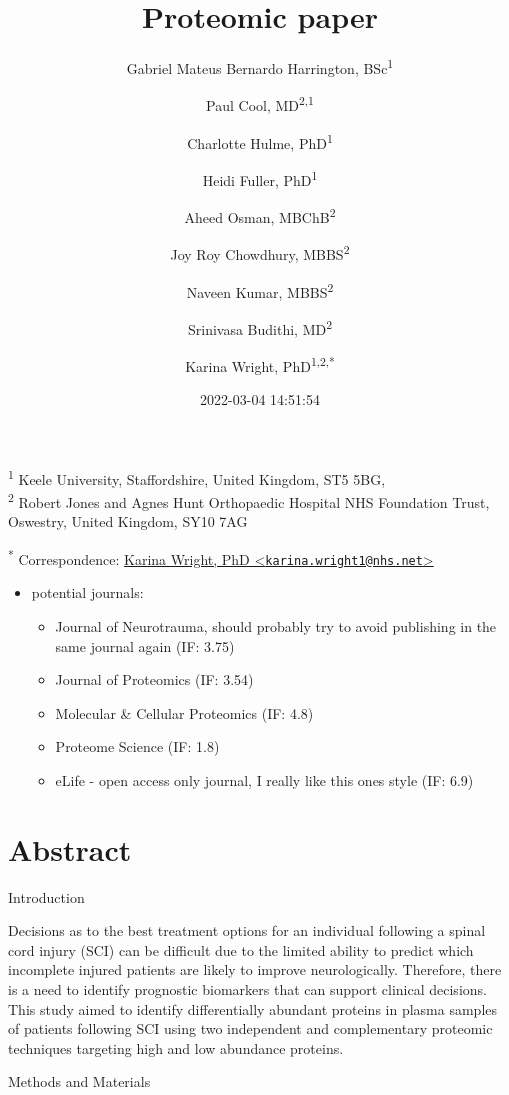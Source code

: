 \documentclass[
]{article}
\title{Proteomic paper}
\author{Gabriel Mateus Bernardo Harrington, BSc\textsuperscript{1} \and Paul Cool, MD\textsuperscript{2,1} \and Charlotte Hulme, PhD\textsuperscript{1} \and Heidi Fuller, PhD\textsuperscript{1} \and Aheed Osman, MBChB\textsuperscript{2} \and Joy Roy Chowdhury, MBBS\textsuperscript{2} \and Naveen Kumar, MBBS\textsuperscript{2} \and Srinivasa Budithi, MD\textsuperscript{2} \and Karina Wright, PhD\textsuperscript{1,2,*}}
\date{2022-03-04 14:51:54}
\providecommand{\tightlist}{%
  \setlength{\itemsep}{0pt}\setlength{\parskip}{0pt}}
\begin{document}
\maketitle

\textsuperscript{1} Keele University, Staffordshire, United Kingdom, ST5 5BG,\\
\textsuperscript{2} Robert Jones and Agnes Hunt Orthopaedic Hospital NHS Foundation Trust, Oswestry, United Kingdom, SY10 7AG

\textsuperscript{*} Correspondence: \href{mailto:karina.wright1@nhs.net}{Karina Wright, PhD \textless{}\href{mailto:karina.wright1@nhs.net}{\nolinkurl{karina.wright1@nhs.net}}\textgreater{}}

\begin{itemize}
\tightlist
\item
  potential journals:

  \begin{itemize}
  \tightlist
  \item
    Journal of Neurotrauma, should probably try to avoid publishing in the same journal again (IF: 3.75)
  \item
    Journal of Proteomics (IF: 3.54)
  \item
    Molecular \& Cellular Proteomics (IF: 4.8)
  \item
    Proteome Science (IF: 1.8)
  \item
    eLife - open access only journal, I really like this ones style (IF: 6.9)
  \end{itemize}
\end{itemize}

\hypertarget{abstract}{%
\section{Abstract}\label{abstract}}

Introduction

Decisions as to the best treatment options for an individual following a spinal cord injury (SCI) can be difficult due to the limited ability to predict which incomplete injured patients are likely to improve neurologically.
Therefore, there is a need to identify prognostic biomarkers that can support clinical decisions.
This study aimed to identify differentially abundant proteins in plasma samples of patients following SCI using two independent and complementary proteomic techniques targeting high and low abundance proteins.

Methods and Materials
\end{document}
